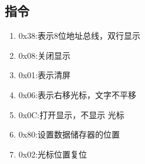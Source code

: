 \documentclass{article}
\begin{document}
\begin{CJK}{UTF8}{gkai}
\begin{table}
\subsection{指令}
\begin{enumerate}
  \item 0x38:表示8位地址总线，双行显示
  \item 0x08:关闭显示
  \item 0x01:表示清屏
  \item 0x06:表示右移光标，文字不平移
  \item 0x0C:打开显示，不显示 光标
  \item 0x80:设置数据储存器的位置
  \item 0x02:光标位置复位
\end{enumerate}

\end{table}


\end{CJK}
\end{document}
